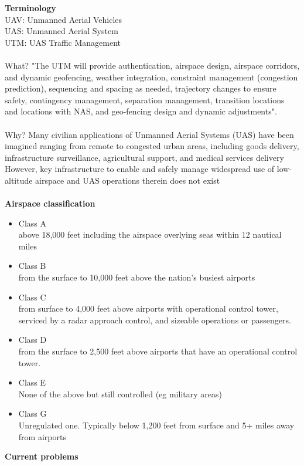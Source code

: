 \documentclass[10pt,a4paper]{book}
\begin{document}
\textbf{Terminology}\\
UAV: Unmanned Aerial Vehicles\\
UAS: Unmanned Aerial System\\
UTM: UAS Traffic Management\\\\
What? "The UTM will provide authentication, airspace design, airspace corridors, and dynamic
geofencing, weather integration, constraint management (congestion prediction), sequencing
and spacing as needed, trajectory changes to ensure safety, contingency management,
separation management, transition locations and locations with NAS, and geo-fencing design
and dynamic adjustments".\\\\
Why? Many civilian applications of Unmanned Aerial Systems (UAS) have been imagined ranging
from remote to congested urban areas, including goods delivery, infrastructure surveillance,
agricultural support, and medical services delivery\\
However, key infrastructure to enable and safely manage widespread use of low-altitude
airspace and UAS operations therein does not exist\\\\
\textbf{Airspace classification}
\begin{itemize}
\item Class A\\
above 18,000 feet including the airspace overlying seas within 12 nautical miles
\item Class B\\
from the surface to 10,000 feet above the nation's busiest airports
\item Class C\\
from surface to 4,000 feet above airports with operational control tower, serviced by a radar
approach control, and sizeable operations or passengers.
\item Class D\\
from the surface to 2,500 feet above airports that have an operational control tower.
\item Class E\\
None of the above but still controlled (eg military areas)
\item Class G\\
Unregulated one. Typically below 1,200 feet from surface and 5+ miles away from airports
\end{itemize}
\textbf{Current problems}
\end{document}
